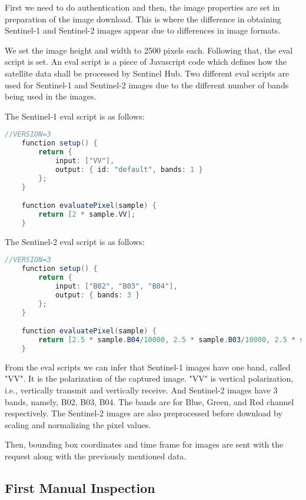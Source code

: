 First we need to do authentication and then, the image properties are set in preparation of the image download. This is where the difference in obtaining Sentinel-1 and Sentinel-2 images appear due to differences in image formats.

We set the image height and width to 2500 pixels each. Following that, the eval script is set. An eval script is a piece of Javascript code which defines how the satellite data shall be processed by Sentinel Hub\cite{evalDoc}. Two different eval scripts are used for Sentinel-1 and Sentinel-2 images due to the different number of bands being used in the images.

The Sentinel-1 eval script is as follows:

\begin{lstlisting}[language=Java]
    //VERSION=3
    function setup() {
        return {
            input: ["VV"],
            output: { id: "default", bands: 1 }
        };
    }

    function evaluatePixel(sample) {
        return [2 * sample.VV];
    }
\end{lstlisting}

The Sentinel-2 eval script is as follows:

\begin{lstlisting}[language=Java]
    //VERSION=3
    function setup() {
        return {
            input: ["B02", "B03", "B04"],
            output: { bands: 3 }
        };
    }

    function evaluatePixel(sample) {
        return [2.5 * sample.B04/10000, 2.5 * sample.B03/10000, 2.5 * sample.B02/10000];
    }
\end{lstlisting}

From the eval scripts we can infer that Sentinel-1 images have one band, called "VV". It is the polarization of the captured image. "VV" is vertical polarization, i.e.,  vertically transmit and vertically receive. And Sentinel-2 images have 3 bands, namely, B02, B03, B04. The bands are for Blue, Green, and Red channel respectively. The Sentinel-2 images are also preprocessed before download by scaling and normalizing the pixel values. 

Then, bounding box coordinates and time frame for images are sent with the request along with the previously mentioned data.

\subsection{First Manual Inspection}

